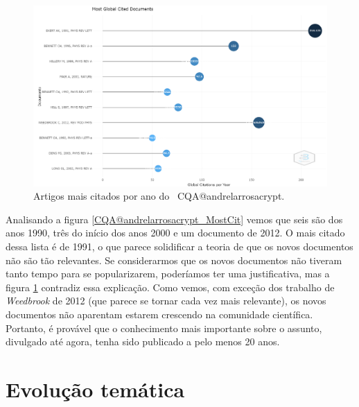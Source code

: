 \begin{figure}
    \centering
    \includegraphics[width=1\textwidth]{experiments/andrelarrosacrypt/AnaliseBibliometrica/CriptografiaQuantica/imagens/CQA@andrelarrosacrypt_MostCit2.png}
    \caption{Artigos mais citados por ano do \dataset\ CQA@andrelarrosacrypt.}
    \label{CQA@andrelarrosacrypt_MostCit2}
\end{figure}

Analisando a figura \ref{CQA@andrelarrosacrypt_MostCit} vemos que seis são dos anos 1990, três do início dos anos 2000 e um documento de 2012. O mais citado dessa lista é de 1991, o que parece solidificar a teoria de que os novos documentos não são tão relevantes. Se considerarmos que os novos documentos não tiveram tanto tempo para se popularizarem, poderíamos ter uma justificativa, mas a figura \ref{CQA@andrelarrosacrypt_MostCit2} contradiz essa explicação. Como vemos, com exceção dos trabalho de \textit{Weedbrook} de 2012 (que parece se tornar cada vez mais relevante), os novos documentos não aparentam estarem crescendo na comunidade científica. Portanto, é provável que o conhecimento mais importante sobre o assunto, divulgado até agora, tenha sido publicado a pelo menos 20 anos.

\section{Evolução temática}


